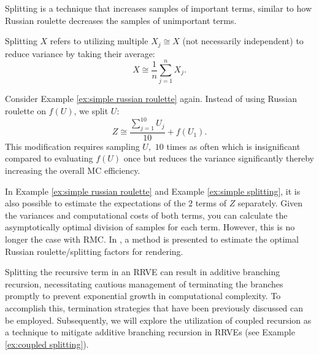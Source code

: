 \documentclass[a4paper,12pt]{article}
\begin{document}
Splitting is a technique that increases samples of important terms, similar to how Russian roulette
decreases the samples of unimportant terms.

\begin{definition}[Splitting] \label{def:splitting}
  Splitting $X$ refers to utilizing multiple $X_{j} \cong X$ (not necessarily independent) to
  reduce variance by taking their average:
  \begin{equation}
    X \cong \frac{1}{n} \sum_{j=1}^{n} X_{j}.
  \end{equation}
\end{definition}

\begin{example} \label{ex:simple splitting}
  Consider Example \ref{ex:simple russian roulette} again.
  Instead of using Russian roulette on $f(U)$, we split $U$:
  \begin{equation}
    Z \cong \frac{\sum_{j=1}^{10} U_j}{10} + f(U_{1}).
  \end{equation}
  This modification requires sampling $U,$
  $10$ times as often which is insignificant compared to evaluating $f(U)$ once
  but reduces the variance significantly thereby increasing the overall MC efficiency.\\
\end{example}

\begin{related}
  In Example \ref{ex:simple russian roulette} and Example \ref{ex:simple splitting},
  it is also possible to estimate the expectations of the $2$ terms
  of $Z$ separately. Given the variances and computational costs
  of both terms, you can calculate the asymptotically optimal division
  of samples for each term. However, this is no longer the case with RMC.
  In \cite{rath_ears_2022}, a method is presented to estimate the optimal
  Russian roulette/splitting factors for rendering.
\end{related}

Splitting the recursive term in an RRVE can result in additive branching recursion,
necessitating cautious management of terminating the branches promptly to prevent
exponential growth in computational complexity. To accomplish this, termination
strategies that have been previously discussed can be employed. Subsequently,
we will explore the utilization of coupled recursion as a technique to mitigate
additive branching recursion in RRVEs (see Example \ref{ex:coupled splitting}).
\end{document}
